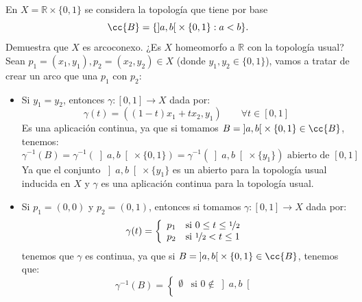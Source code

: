 \begin{ejercicio}
    En $X=\mathbb{R}\times \{0,1\}$ se considera la topología que tiene por base
    \begin{equation*}
        \cc{B} = \{\left]a,b\right[\times \{0,1\} : a<b\}.
    \end{equation*}
    Demuestra que $X$ es arcoconexo. ¿Es $X$ homeomorfo a $\mathbb{R}$ con la topología usual?\\

    \noindent
    Sean $p_1=(x_1,y_1),p_2=(x_2,y_2)\in X$ (donde $y_1, y_2\in \{0,1\}$), vamos a tratar de crear un arco que una $p_1$ con $p_2$:
    \begin{itemize}
        \item Si $y_1=y_2$, entonces $\gamma:[0,1]\to X$ dada por:
            \begin{equation*}
                \gamma(t) = ((1-t)x_1 + tx_2, y_1) \qquad \forall t\in [0,1]
            \end{equation*}
            Es una aplicación continua, ya que si tomamos $B = \left]a,b\right[\times \{0,1\}\in \cc{B}$, tenemos:
            \begin{equation*}
                \gamma^{-1}(B) = \gamma^{-1}(\left]a,b\right[\times \{0,1\}) = \gamma^{-1}(\left]a,b\right[\times \{y_1\}) \text{\ abierto de\ } [0,1]
            \end{equation*}
            Ya que el conjunto $\left]a,b\right[\times \{y_1\}$ es un abierto para la topología usual inducida en $X$ y $\gamma$ es una aplicación continua para la topología usual.
        \item Si $p_1 = (0,0)$ y $p_2 = (0,1)$, entonces si tomamos $\gamma:[0,1]\to X$ dada por:
            \begin{equation*}
                \gamma(t) = \left\{\begin{array}{ll}
                        p_1 & \text{si\ } 0 \leq t \leq \nicefrac{1}{2}\\
                        p_2 & \text{si\ } \nicefrac{1}{2}<t \leq 1
                \end{array}\right.
            \end{equation*}
            tenemos que $\gamma$ es continua, ya que si $B = \left]a,b\right[\times \{0,1\}\in \cc{B}$, tenemos que:
            \begin{equation*}
                \gamma^{-1}(B) = \left\{\begin{array}{cl}
                        \emptyset & \text{si\ } 0 \notin \left]a,b\right[ \\

\end{array}
\end{equation*}
\end{itemize}
\end{ejercicio}
